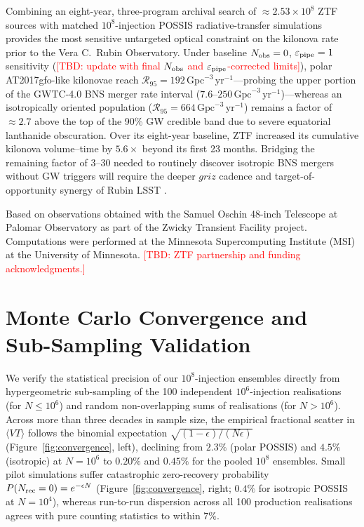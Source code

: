 \documentclass[twocolumn]{aastex631}
\newcommand{\tbd}[1]{\textcolor{red}{[TBD: #1]}}
\newcommand{\rlim}{\mathcal{R}_{95}}
\newcommand{\vteff}{\langle VT\rangle}
\newcommand{\epspipe}{\varepsilon_{\rm pipe}}
\newcommand{\gpcyr}{\mathrm{Gpc}^{-3}\,\mathrm{yr}^{-1}}
\begin{document}
Combining an eight-year, three-program archival search of $\approx 2.53\times 10^8$ ZTF sources with matched $10^8$-injection POSSIS radiative-transfer simulations provides the most sensitive untargeted optical constraint on the kilonova rate prior to the Vera C.\ Rubin Observatory. Under baseline $N_{\rm obs}=0$, $\epspipe=1$ sensitivity (\tbd{update with final $N_{\rm obs}$ and $\epspipe$-corrected limits}), polar AT2017gfo-like kilonovae reach $\rlim = 192\,\gpcyr$---probing the upper portion of the GWTC-4.0 BNS merger rate interval ($7.6$--$250\,\gpcyr$)---whereas an isotropically oriented population ($\rlim = 664\,\gpcyr$) remains a factor of $\approx 2.7$ above the top of the 90\% GW credible band due to severe equatorial lanthanide obscuration. Over its eight-year baseline, ZTF increased its cumulative kilonova volume--time by $5.6\times$ beyond its first 23 months. Bridging the remaining factor of $3$--$30$ needed to routinely discover isotropic BNS mergers without GW triggers will require the deeper $griz$ cadence and target-of-opportunity synergy of Rubin LSST \citep{Andreoni2022Rubin}.

\begin{acknowledgments}
Based on observations obtained with the Samuel Oschin 48-inch Telescope at Palomar Observatory as part of the Zwicky Transient Facility project. Computations were performed at the Minnesota Supercomputing Institute (MSI) at the University of Minnesota. \tbd{ZTF partnership and funding acknowledgments.}
\end{acknowledgments}


\appendix

\section{Monte Carlo Convergence and Sub-Sampling Validation}
\label{sec:convergence}

We verify the statistical precision of our $10^8$-injection ensembles directly from hypergeometric sub-sampling of the 100 independent $10^6$-injection realisations (for $N \le 10^6$) and random non-overlapping sums of realisations (for $N > 10^6$). Across more than three decades in sample size, the empirical fractional scatter in $\vteff$ follows the binomial expectation $\sqrt{(1-\epsilon)/(N\epsilon)}$ (Figure~\ref{fig:convergence}, left), declining from $2.3\%$ (polar POSSIS) and $4.5\%$ (isotropic) at $N = 10^6$ to $0.20\%$ and $0.45\%$ for the pooled $10^8$ ensembles. Small pilot simulations suffer catastrophic zero-recovery probability $P(N_{\rm rec}=0) = e^{-\epsilon N}$ (Figure~\ref{fig:convergence}, right; $0.4\%$ for isotropic POSSIS at $N=10^4$), whereas run-to-run dispersion across all 100 production realisations agrees with pure counting statistics to within $7\%$.
\end{document}
